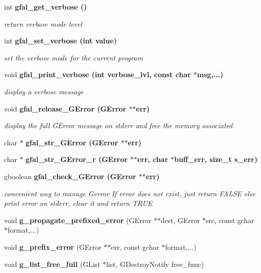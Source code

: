 \begin{CompactItemize}
\item 
int \bf{gfal\_\-get\_\-verbose} ()\label{gfal__common__errverbose_8c_135b3fdd775aa7215e2ab4de1eea495f}

\begin{CompactList}\small\item\em return verbose mode level \item\end{CompactList}\item 
int \bf{gfal\_\-set\_\-verbose} (int value)
\begin{CompactList}\small\item\em set the verbose mode for the current program \item\end{CompactList}\item 
void \bf{gfal\_\-print\_\-verbose} (int verbose\_\-lvl, const char $\ast$msg,...)
\begin{CompactList}\small\item\em display a verbose message \item\end{CompactList}\item 
void \bf{gfal\_\-release\_\-GError} (GError $\ast$$\ast$err)\label{gfal__common__errverbose_8c_1441ea4b8176eb0cf3099009b950a3e9}

\begin{CompactList}\small\item\em display the full GError message on stderr and free the memory associated \item\end{CompactList}\item 
char $\ast$ \bf{gfal\_\-str\_\-GError} (GError $\ast$$\ast$err)
\item 
char $\ast$ \bf{gfal\_\-str\_\-GError\_\-r} (GError $\ast$$\ast$err, char $\ast$buff\_\-err, size\_\-t s\_\-err)
\item 
gboolean \bf{gfal\_\-check\_\-GError} (GError $\ast$$\ast$err)\label{gfal__common__errverbose_8c_9167aee5bda42b71a982f863e88f7bfd}

\begin{CompactList}\small\item\em convenient way to manage Gerror If error does not exist, just return FALSE else print error on stderr, clear it and return TRUE \item\end{CompactList}\item 
void \textbf{g\_\-propagate\_\-prefixed\_\-error} (GError $\ast$$\ast$dest, GError $\ast$src, const gchar $\ast$format,...)\label{gfal__common__errverbose_8c_ba441719ee1fd49a708add03c0eea22f}

\item 
void \textbf{g\_\-prefix\_\-error} (GError $\ast$$\ast$err, const gchar $\ast$format,...)\label{gfal__common__errverbose_8c_0c7cc2a68d8e7b0bed51a834aa54fa0d}

\item 
void \textbf{g\_\-list\_\-free\_\-full} (GList $\ast$list, GDestroy\-Notify free\_\-func)\label{gfal__common__errverbose_8c_0d507092f75c2411862d210dbecbc4e5}

\end{CompactItemize}
